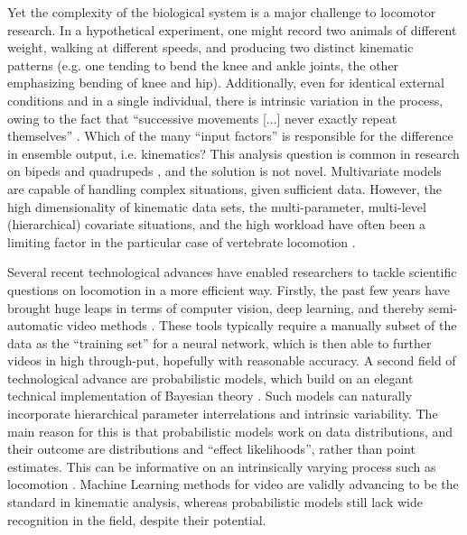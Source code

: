 Yet the complexity of the biological system is a major challenge to locomotor research.
In a hypothetical experiment, one might record two animals of different weight, walking at different speeds, and producing two distinct kinematic patterns (e.g. one tending to bend the knee and ankle joints, the other emphasizing bending of knee and hip).
Additionally, even for identical external conditions and in a single individual, there is intrinsic variation in the process, owing to the fact that ``successive movements [...] never exactly repeat themselves'' \citep{Bernstein1935}.
Which of the many ``input factors'' is responsible for the difference in ensemble output, i.e. kinematics?
This analysis question is common in research on bipeds \citep[e.g.][]{Ganley2005,StifflerJoachim2020,Bruton2013} and quadrupeds \citep[e.g.][]{Irschick1999,Pike2002,Stavrakakis2014}, and the solution is not novel.
Multivariate models are capable of handling complex situations, given sufficient data.
However, the high dimensionality of kinematic data sets, the multi-parameter, multi-level (hierarchical) covariate situations, and the high  workload have often been a limiting factor in the particular case of vertebrate locomotion \citep{Seethapathi2019,Michelini2020,Jackson2016}.


Several recent technological advances have enabled researchers to tackle scientific questions on locomotion in a more efficient way.
Firstly, the past few years have brought huge leaps in terms of computer vision, deep learning, and thereby semi-automatic video  methods \citep[][\textit{cf.} Ch. \ref{cpt:digitization}]{Karashchuk2021,Mathis2020,Jackson2016,Corcoran2021,MMielke2020}.
These tools typically require a manually  subset of the data as the ``training set'' for a neural network, which is then able to  further videos in high through-put, hopefully with reasonable accuracy.
A second field of technological advance are probabilistic models, which build on an elegant technical implementation of Bayesian theory \citep[Markov Chain Monte Carlo / MCMC sampling, \textit{cf.}][]{McElreath2018,Gelman2013,vandeSchoot2021}.
Such models can naturally incorporate hierarchical parameter interrelations and intrinsic variability.
The main reason for this is that probabilistic models work on data distributions, and their outcome are distributions and ``effect likelihoods'', rather than point estimates.
This can be informative on an intrinsically varying process such as locomotion \citep{Mielke2018}. %
Machine Learning methods for video  are validly advancing to be the standard in kinematic analysis, whereas probabilistic models still lack wide recognition in the field, despite their potential.


